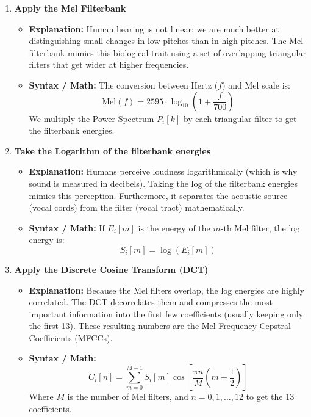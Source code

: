 \begin{enumerate}
  \item \textbf{Apply the Mel Filterbank}
  \begin{itemize}
      \item \textbf{Explanation:} Human hearing is not linear; we are much better at distinguishing small changes in low pitches than in high pitches. The Mel filterbank mimics this biological trait using a set of overlapping triangular filters that get wider at higher frequencies.
      \item \textbf{Syntax / Math:} The conversion between Hertz ($f$) and Mel scale is:
      \begin{equation}
          \text{Mel}(f) = 2595 \cdot \log_{10}\left(1 + \frac{f}{700}\right)
      \end{equation}
      We multiply the Power Spectrum $P_i[k]$ by each triangular filter to get the filterbank energies.
  \end{itemize}

  \item \textbf{Take the Logarithm of the filterbank energies}
  \begin{itemize}
      \item \textbf{Explanation:} Humans perceive loudness logarithmically (which is why sound is measured in decibels). Taking the log of the filterbank energies mimics this perception. Furthermore, it separates the acoustic source (vocal cords) from the filter (vocal tract) mathematically.
      \item \textbf{Syntax / Math:} If $E_i[m]$ is the energy of the $m$-th Mel filter, the log energy is:
      \begin{equation}
          S_i[m] = \log(E_i[m])
      \end{equation}
  \end{itemize}

  \item \textbf{Apply the Discrete Cosine Transform (DCT)}
  \begin{itemize}
      \item \textbf{Explanation:} Because the Mel filters overlap, the log energies are highly correlated. The DCT decorrelates them and compresses the most important information into the first few coefficients (usually keeping only the first 13). These resulting numbers are the Mel-Frequency Cepstral Coefficients (MFCCs).
      \item \textbf{Syntax / Math:}
      \begin{equation}
          C_i[n] = \sum_{m=0}^{M-1} S_i[m] \cos\left[ \frac{\pi n}{M} \left(m + \frac{1}{2}\right) \right]
      \end{equation}
      Where $M$ is the number of Mel filters, and $n = 0, 1, \dots, 12$ to get the 13 coefficients.
  \end{itemize}

\end{enumerate}

